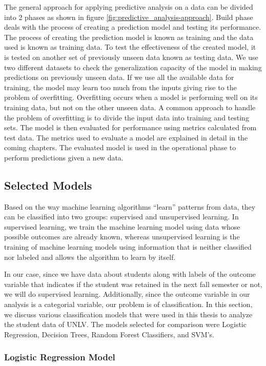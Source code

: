 \documentclass[11pt,openright]{report}
\begin{document}
The general approach for applying predictive analysis on a data can be divided into 2 phases as shown in figure \ref{fig:predictive_analysis-approach}. Build phase deals with the process of creating a prediction model and testing its performance. The process of creating the prediction model is known as training and the data used is known as training data. To test the effectiveness of the created model, it is tested on another set of previously unseen data known as testing data. We use two different datasets to check the generalization capacity of the model in making predictions on previously unseen data. If we use all the available data for training, the model may learn too much from the inputs giving rise to the problem of overfitting. Overfitting occurs when a model is performing well on its training data, but not on the other unseen data. A common approach to handle the problem of overfitting is to divide the input data into training and testing sets. The model is then evaluated for performance using metrics calculated from test data. The metrics used to evaluate a model are explained in detail in the coming chapters. The evaluated model is used in the operational phase to perform predictions given a new data. 

\subsection{Selected Models}
Based on the way machine learning algorithms ``learn'' patterns from data, they can be classified into two groups: supervised and unsupervised learning. In supervised learning, we train the machine learning model using data whose possible outcomes are already known, whereas unsupervised learning is the training of machine learning models using information that is neither classified nor labeled and allows the algorithm to learn by itself. 

In our case, since we have data about students along with labels of the outcome variable that indicates if the student was retained in the next fall semester or not, we will do supervised learning. Additionally, since the outcome variable in our analysis is a categorial variable, our problem is of classification. In this section, we discuss various classification models that were used in this thesis to analyze the student data of UNLV. The models selected for comparison were Logistic Regression, Decision Trees, Random Forest Classifiers, and SVM's.

\subsubsection {Logistic Regression Model}
\end{document}
